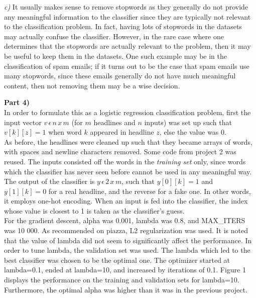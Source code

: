 \documentclass{article}
\begin{document}
\textit{c)} It usually makes sense to remove stopwords as they generally do not provide any meaningful information to the classifier since they are typically not relevant to the classification problem. In fact, having lots of stopwords in the datasets may actually confuse the classifier. However, in the rare case where one determines that the stopwords are actually relevant to the problem, then it may be useful to keep them in the datasets. One such example may be in the classification of spam emails; if it turns out to be the case that spam emails use many stopwords, since these emails generally do not have much meaningful content, then not removing them may be a wise decision.\newpage

\textbf{Part 4)}\\
In order to formulate this as a logistic regression classification problem, first the input vector $v\,\epsilon\, n\,x\,m$ (for $m$ headlines and $n$ inputs) was set up such that $v[k][z]=1$ when word $k$ appeared in headline $z$, else the value was 0.\\

As before, the headlines were cleaned up such that they became arrays of words, with spaces and newline characters removed. Some code from project 2 was reused. The inputs consisted off the words in the \textit{training set} only, since words which the classifier has never seen before cannot be used in any meaningful way. The output of the classifier is $y\,\epsilon\, 2\,x\,m$, such that $y[0][k]=1$ and $y[1][k]=0$ for a real headline, and the reverse for a fake one. In other words, it employs one-hot encoding. When an input is fed into the classifier, the index whose value is closest to 1 is taken as the classifier's guess.\\

For the gradient descent, alpha was 0.001, lambda was 0.8, and MAX\_ITERS was 10 000. As recommended on piazza, L2 regularization was used. It is noted that the value of lambda did not seem to significantly affect the performance. In order to tune lambda, the validation set was used. The lambda which led to the best classifier was chosen to be the optimal one. The optimizer started at lambda=0.1, ended at lambda=10, and increased by iterations of 0.1. Figure 1 displays the performance on the training and validation sets for lambda=10. Furthermore, the optimal alpha was higher than it was in the previous project.\\
\end{document}
